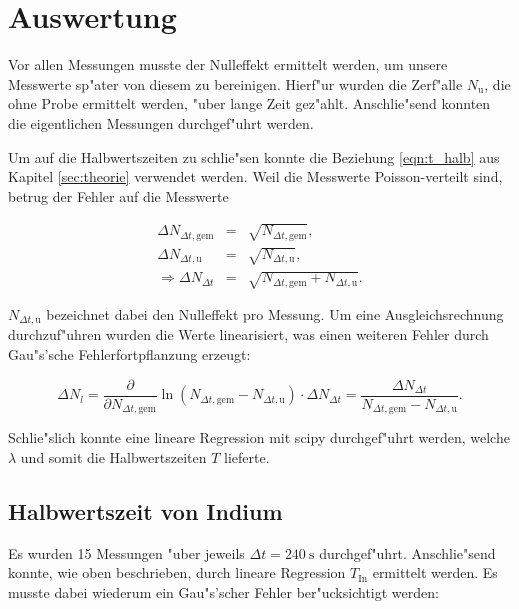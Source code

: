 \section{Auswertung}
	\label{sec:auswertung}
	Vor allen Messungen musste der Nulleffekt ermittelt werden, um unsere Messwerte sp"ater von diesem zu bereinigen.
	Hierf"ur wurden die Zerf"alle $N_{\mathrm{u}}$, die ohne Probe ermittelt werden, "uber lange Zeit gez"ahlt.
	Anschlie"send konnten die eigentlichen Messungen durch\-ge\-f"uhrt werden.
	

	Um auf die Halbwertszeiten zu schlie"sen konnte die Beziehung \eqref{eqn:t_halb} aus Kapitel \ref{sec:theorie} ver\-wen\-det werden.
	Weil die Messwerte Poisson-verteilt sind, betrug der Fehler auf die Messwerte

	\begin{eqnarray*}
		\Delta N_{\Delta t, \mathrm{gem}} & = & \sqrt{N_{\Delta t, \mathrm{gem}}}, \\
		\Delta N_{\Delta t, \mathrm{u}} & = & \sqrt{N_{\Delta t, \mathrm{u}}},\\
		\Rightarrow \Delta N_{\Delta t} & = & \sqrt{N_{\Delta t, \mathrm{gem}} + N_{\Delta t, \mathrm{u}}} .
	\end{eqnarray*}

	$N_{\Delta t, \mathrm{u}}$ bezeichnet dabei den Nulleffekt pro Messung.
	Um eine Ausgleichsrechnung durch\-zu\-f"uh\-ren wurden die Werte linearisiert, was einen weiteren Fehler durch Gau"s'sche Fehlerfortpflanzung erzeugt:

	\begin{equation*}
		\Delta N_{l} = \frac{\partial}{\partial N_{\Delta t, \mathrm{gem}}} \ln{\left( N_{\Delta t, \mathrm{gem}} - N_{\Delta t, \mathrm{u}} \right)} \cdot \Delta N_{\Delta t} = \frac{\Delta N_{\Delta t}}{N_{\Delta t, \mathrm{gem}} - N_{\Delta t, \mathrm{u}}} .
	\end{equation*}

	Schlie"slich konnte eine lineare Regression mit scipy durchgef"uhrt werden, welche $\lambda$ und somit die Halbwertszeiten $T$ lieferte.

	\subsection{Halbwertszeit von Indium}
		\label{subsec:indium}
		Es wurden 15 Messungen "uber jeweils $\Delta t = \SI{240}{\second}$ durchgef"uhrt.
		Anschlie"send konnte, wie oben beschrieben, durch lineare Regression $T_\mathrm{In}$ ermittelt werden. Es musste dabei wiederum ein Gau"s'scher Fehler ber"ucksichtigt werden:


